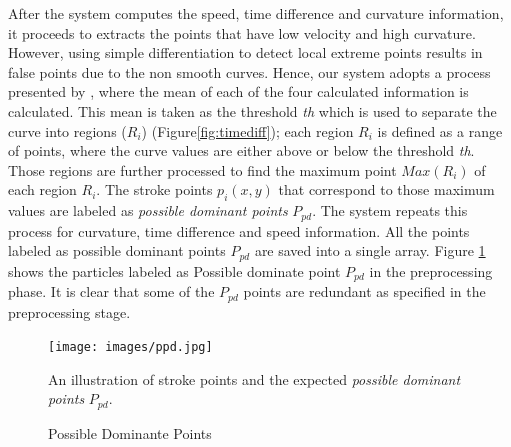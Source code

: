 \documentclass[preprint,1p,times,review]{elsarticle}
\begin{document}
After the system computes the speed, time difference and curvature information,
it proceeds to extracts the points that have low velocity and high curvature.
However, using simple differentiation to detect local extreme points results in
false points due to the non smooth curves. Hence, our system adopts a process
presented by \cite{earlyprocess}, where the mean of each of the four calculated
information is calculated. This mean is taken as the threshold \textit{th} which
is used to separate the curve into regions ($R_i$) (Figure\ref{fig:timediff});
each region $R_i$ is defined as a range of points, where the curve values are
either above or below the threshold \textit{th}. Those regions are further
processed to find the maximum point $Max(R_i)$ of each region $R_i$. The stroke
points $p_i(x,y)$ that correspond to those maximum values are labeled as
\textit{possible dominant points} $P_{pd}$. The system repeats this process for
curvature, time difference and speed information. All the points labeled as
possible dominant points $P_{pd}$ are saved into a single array. Figure
\ref{fig:ppd999} shows the particles labeled as Possible dominate point $P_{pd}$
in the preprocessing phase. It is clear that some of the $P_{pd}$ points are
redundant as specified in the preprocessing stage. %
\begin{figure}
	\centering
\texttt{[image: images/ppd.jpg]}
	\caption{Possible Dominante Points} An illustration of stroke points and
the expected \textit{possible dominant points} $P_{pd}$.
	\label{fig:ppd999}
\end{figure}

\end{document}
